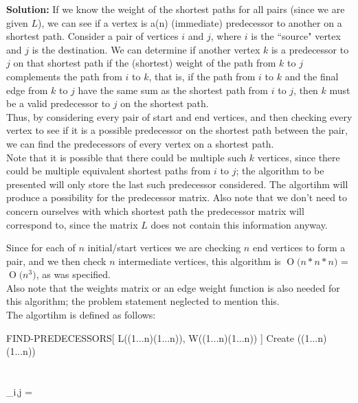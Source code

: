 \documentclass[11pts]{article}
\newcommand{\BigO}[1]{\ensuremath{\operatorname{O}\bigl(#1\bigr)}}
\begin{document}
\begin{enumerate}
  \textbf{Solution:} If we know the weight of the shortest paths for all
  pairs (since we are given $L$), we can see if a vertex is a(n) (immediate)
  predecessor to another on a shortest path. Consider a pair of vertices
  $i$ and $j$, where $i$ is the ``source" vertex and $j$ is the destination.
  We can determine if another vertex $k$ is a predecessor to $j$ on that
  shortest path if the (shortest) weight of the path from
  $k$ to $j$ complements the
  path from $i$ to $k$, that is, if the path from $i$ to $k$ and the final edge
  from $k$ to $j$ have the same sum as the shortest path from $i$ to $j$, then
  $k$ must be a valid predecessor to $j$ on the shortest path. \\

  Thus, by considering every pair of start and end vertices, and then
  checking every vertex to see if it is a possible predecessor on the shortest
  path between the pair, we can find the predecessors of every vertex on
  a shortest path. \\

  Note that it is possible that there could be multiple such $k$ vertices,
  since there could be multiple equivalent shortest paths from $i$ to $j$;
  the algorithm to be presented will only store the last such predecessor
  considered. The algortihm will produce a possibility for the predecessor
  matrix. Also note that we don't need to concern ourselves with which
  shortest path the predecessor matrix will correspond to, since the matrix
  $L$ does not contain this information anyway.

  Since for each of $n$ initial/start vertices we are checking $n$ end
  vertices to form a pair, and we then check $n$ intermediate vertices,
  this algorithm is \BigO{n * n * n} = \BigO{n^3}, as was specified. \\

  Also note that the weights matrix or an edge weight function is also
  needed for this algorithm; the problem statement neglected to mention this. \\

  The algortihm is defined as follows:
\begin{algorithm}{FIND-PREDECESSORS}[ L((1...n)(1...n)), W((1...n)(1...n)) ]{
   }
  Create \Pi((1...n)(1...n)) \\
   \\
  \qdo
     \\
    \qdo
      \pi_{i,j} = \qnil \\
    \qrof \\
  \qrof \\


\end{algorithm}
\end{enumerate}
\end{document}
